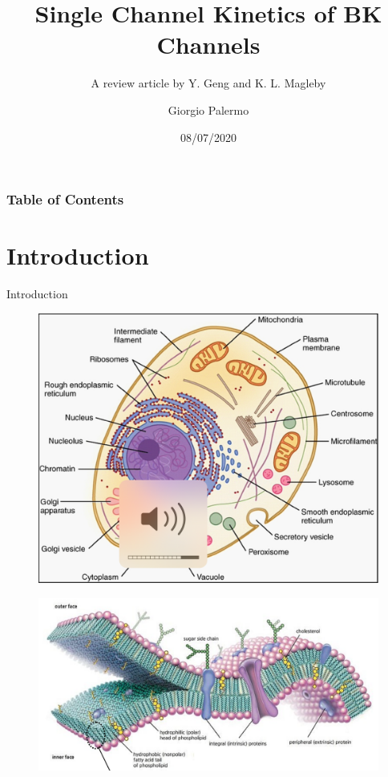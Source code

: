 \documentclass{beamer}
\title{Single Channel Kinetics of BK Channels}
\subtitle{A review article by Y. Geng and K. L. Magleby}
\author{Giorgio Palermo}
\date{08/07/2020}
\institute{LM Physics - a.a. 2019/20 - Biological Physics }
\begin{document}
\begin{frame}{}
  \titlepage
\end{frame}

\begin{frame}
\frametitle{Table of Contents}
\tableofcontents
\end{frame}

\section{Introduction}

\begin{frame}{Introduction}
\begin{minipage}{.4\textwidth}
\begin{figure}
\centering
\includegraphics[width=\textwidth]{Cell_Cartoon.png}
\end{figure}
\end{minipage}
\hfill
\begin{minipage}{.5\textwidth}
\begin{figure}
\centering
\includegraphics[width=\textwidth]{Cell_Membrane.png}
\end{figure}
\end{minipage}


\end{frame}
\end{document}
